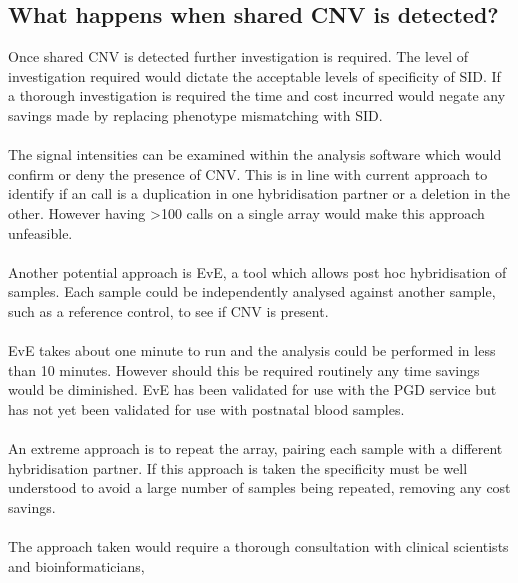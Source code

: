 \subsection{What happens when shared CNV is detected?}
Once shared CNV is detected further investigation is required. The level of investigation required would dictate the acceptable levels of specificity of SID. If a thorough investigation is required the time and cost incurred would negate any savings made by replacing phenotype mismatching with SID.
\paragraph*{}
The signal intensities can be examined within the analysis software which would confirm or deny the presence of CNV. This is in line with current approach to identify if an call is a duplication in one hybridisation partner or a deletion in the other. However having \textgreater 100 calls on a single array would make this approach unfeasible.
\paragraph*{}
Another potential approach is EvE, a tool which allows post hoc hybridisation of samples. Each sample could be independently analysed against another sample, such as a reference control, to see if CNV is present. 
\paragraph*{}
EvE takes about one minute to run and the analysis could be performed in less than 10 minutes. However should this be required routinely any time savings would be diminished.
EvE has been validated for use with the PGD service but has not yet been validated for use with postnatal blood samples.
\paragraph*{}
An extreme approach is to repeat the array, pairing each sample with a different hybridisation partner. If this approach is taken the specificity must be well understood to avoid a large number of samples being repeated, removing any cost savings.
\paragraph*{}
The approach taken would require a thorough consultation with clinical scientists and bioinformaticians,

